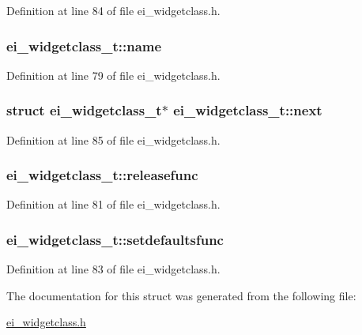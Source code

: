 Definition at line 84 of file ei\-\_\-widgetclass.\-h.

\hypertarget{structei__widgetclass__t_aa5799b5999890cf04915bf0fe5151ec8}{
\subsubsection[{name}]{ ei\-\_\-widgetclass\-\_\-t\-::name}}\label{structei__widgetclass__t_aa5799b5999890cf04915bf0fe5151ec8}


Definition at line 79 of file ei\-\_\-widgetclass.\-h.

\hypertarget{structei__widgetclass__t_aa184e650475ec2451f033858db1876f0}{
\subsubsection[{next}]{\setlength{\rightskip}{0pt plus 5cm}struct {\bf ei\-\_\-widgetclass\-\_\-t}$\ast$ ei\-\_\-widgetclass\-\_\-t\-::next}}\label{structei__widgetclass__t_aa184e650475ec2451f033858db1876f0}


Definition at line 85 of file ei\-\_\-widgetclass.\-h.

\hypertarget{structei__widgetclass__t_aebe6139b31816495e866c99ec3e83de6}{
\subsubsection[{releasefunc}]{ ei\-\_\-widgetclass\-\_\-t\-::releasefunc}}\label{structei__widgetclass__t_aebe6139b31816495e866c99ec3e83de6}


Definition at line 81 of file ei\-\_\-widgetclass.\-h.

\hypertarget{structei__widgetclass__t_a5fec706eefca10172d897cf61b268510}{
\subsubsection[{setdefaultsfunc}]{ ei\-\_\-widgetclass\-\_\-t\-::setdefaultsfunc}}\label{structei__widgetclass__t_a5fec706eefca10172d897cf61b268510}


Definition at line 83 of file ei\-\_\-widgetclass.\-h.



The documentation for this struct was generated from the following file\-:\begin{DoxyCompactItemize}
\item 
\hyperlink{ei__widgetclass_8h}{ei\-\_\-widgetclass.\-h}\end{DoxyCompactItemize}
